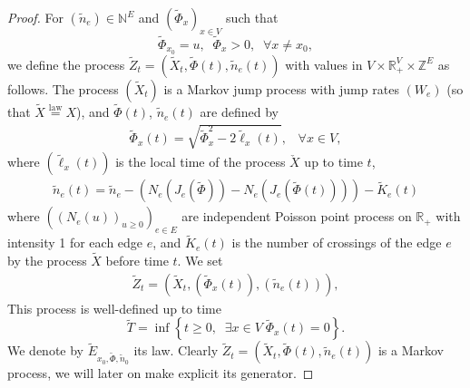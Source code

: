 \documentclass[11pt,a4paper]{amsart}
\numberwithin{equation}{section}
\def\R{{\mathbb R}}
\def\N{{\mathbb N}}
\def\Z{{\mathbb Z}}
\begin{document}
\begin{proof}
For $(\tilde n_e)\in \N^E$ and $(\tilde \Phi_x)_{x\in V}$ such that
$$
\tilde \Phi_{x_0}=u, \;\; \tilde \Phi_x>0, \;\; \forall x\neq x_0,
$$
we define the process $\tilde Z_t=(\tilde X_t, \tilde\Phi(t), \tilde n_e(t))$  with values in $V\times \R_+^V\times \Z^E$  as follows.
The process $(\tilde X_t)$ is a Markov jump process with jump rates $(W_e)$ (so that $\tilde X\stackrel{\text{law}}{=} X$), and
$\tilde\Phi(t)$, $\tilde n_e(t)$ are defined by
\begin{eqnarray}\label{tildePhi}
\tilde \Phi_x(t)=\sqrt{\tilde \Phi_x^2-2\tilde \ell_x(t)},\;\;\;\forall x\in V,
\end{eqnarray}
where $(\tilde\ell_x(t))$ is the local time of the process $\check X$ up to time $t$,
\begin{eqnarray}\label{tilden}
\tilde n_e(t)= \tilde n_e-\left(N_e(J_e(\tilde\Phi))-N_e(J_e(\tilde\Phi(t)))\right)-\tilde K_e(t)
\end{eqnarray}
where $((N_e(u))_{u\ge 0})_{e\in E}$ are independent Poisson point process on $\R_+$ with intensity 1 for each edge $e$, and 
$\tilde K_e(t)$ is the number of crossings of the edge $e$ by the process $\tilde X$ before time $t$.
We set
\begin{eqnarray}\label{tildeZ}
\tilde Z_t=(\tilde X_t, (\tilde \Phi_x(t)), (\tilde n_e(t))),
\end{eqnarray}
This process is well-defined up to time
$$
\tilde T=\inf\left\{t\ge 0, \;\; \exists x\in V\; \tilde \Phi_x(t)=0\right\}.
$$
We denote by $\tilde E_{x_0, \tilde\Phi, \tilde n_0}$ its law. Clearly $\tilde Z_t=(\tilde X_t, \tilde\Phi(t), \tilde n_e(t))$ is a Markov process, we will later on make explicit its generator. 


\end{proof}
\end{document}
